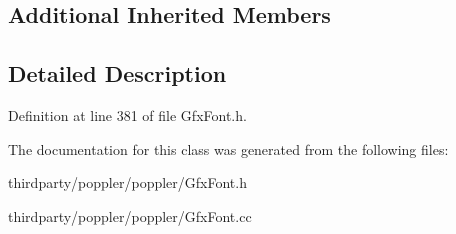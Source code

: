 \subsection*{Additional Inherited Members}


\subsection{Detailed Description}


Definition at line 381 of file Gfx\+Font.\+h.



The documentation for this class was generated from the following files\+:\begin{DoxyCompactItemize}
\item 
thirdparty/poppler/poppler/Gfx\+Font.\+h\item 
thirdparty/poppler/poppler/Gfx\+Font.\+cc\end{DoxyCompactItemize}
